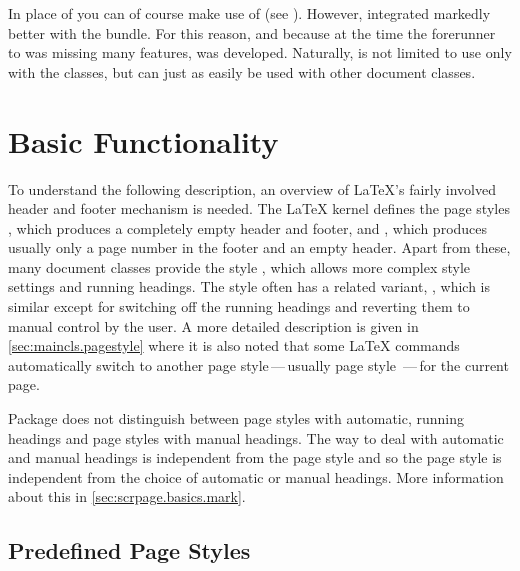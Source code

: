 \begin{Explain}
  In place of  you can of course make use of
   (see \cite{package:fancyhdr}). However,
   integrated markedly better with the {\KOMAScript}
  bundle. For this reason, and because at the time the forerunner to
   was missing many features,  was
  developed. Naturally,  is not limited to use only
  with the {\KOMAScript} classes, but can just as easily be used with
  other document classes.
\end{Explain}


\section{Basic Functionality}

\begin{Explain}%
  To understand the following description, an overview of {\LaTeX}'s fairly
  involved header and footer mechanism is needed.  The {\LaTeX} kernel defines
  the page styles , which produces a completely empty header
  and footer, and , which produces usually only a page number
  in the footer and an empty header.  Apart from these, many document classes
  provide the style , which allows more complex style
  settings and running
  headings.  The
   style often has a related variant,
  , which is similar except for switching off the
  running headings and reverting them to manual control
  by the user.  A more detailed description is given in
  \autoref{sec:maincls.pagestyle} where it is also noted that some {\LaTeX}
  commands automatically switch to another page style\,---\,usually page style
  \,---\,for the current page.
\end{Explain}


Package  does not distinguish between page styles with
automatic, running headings and page styles with manual headings. The way to
deal with automatic and manual headings is independent from the page style and
so the page style is independent from the choice of automatic or manual
headings. More information about this in \autoref{sec:scrpage.basics.mark}.

  
\subsection{Predefined Page Styles}

